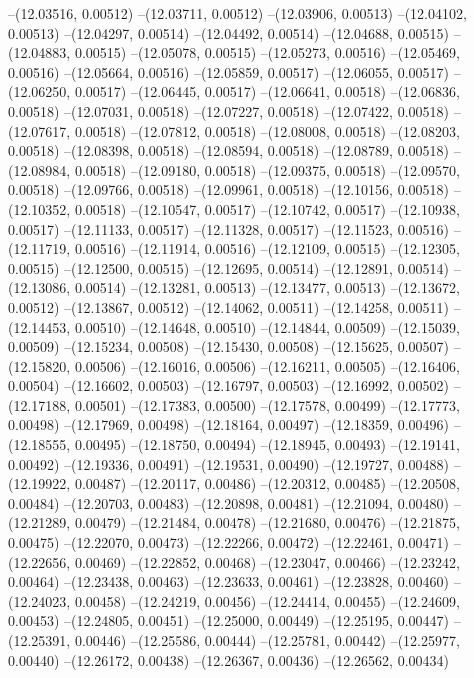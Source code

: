 --(12.03516, 0.00512)
--(12.03711, 0.00512)
--(12.03906, 0.00513)
--(12.04102, 0.00513)
--(12.04297, 0.00514)
--(12.04492, 0.00514)
--(12.04688, 0.00515)
--(12.04883, 0.00515)
--(12.05078, 0.00515)
--(12.05273, 0.00516)
--(12.05469, 0.00516)
--(12.05664, 0.00516)
--(12.05859, 0.00517)
--(12.06055, 0.00517)
--(12.06250, 0.00517)
--(12.06445, 0.00517)
--(12.06641, 0.00518)
--(12.06836, 0.00518)
--(12.07031, 0.00518)
--(12.07227, 0.00518)
--(12.07422, 0.00518)
--(12.07617, 0.00518)
--(12.07812, 0.00518)
--(12.08008, 0.00518)
--(12.08203, 0.00518)
--(12.08398, 0.00518)
--(12.08594, 0.00518)
--(12.08789, 0.00518)
--(12.08984, 0.00518)
--(12.09180, 0.00518)
--(12.09375, 0.00518)
--(12.09570, 0.00518)
--(12.09766, 0.00518)
--(12.09961, 0.00518)
--(12.10156, 0.00518)
--(12.10352, 0.00518)
--(12.10547, 0.00517)
--(12.10742, 0.00517)
--(12.10938, 0.00517)
--(12.11133, 0.00517)
--(12.11328, 0.00517)
--(12.11523, 0.00516)
--(12.11719, 0.00516)
--(12.11914, 0.00516)
--(12.12109, 0.00515)
--(12.12305, 0.00515)
--(12.12500, 0.00515)
--(12.12695, 0.00514)
--(12.12891, 0.00514)
--(12.13086, 0.00514)
--(12.13281, 0.00513)
--(12.13477, 0.00513)
--(12.13672, 0.00512)
--(12.13867, 0.00512)
--(12.14062, 0.00511)
--(12.14258, 0.00511)
--(12.14453, 0.00510)
--(12.14648, 0.00510)
--(12.14844, 0.00509)
--(12.15039, 0.00509)
--(12.15234, 0.00508)
--(12.15430, 0.00508)
--(12.15625, 0.00507)
--(12.15820, 0.00506)
--(12.16016, 0.00506)
--(12.16211, 0.00505)
--(12.16406, 0.00504)
--(12.16602, 0.00503)
--(12.16797, 0.00503)
--(12.16992, 0.00502)
--(12.17188, 0.00501)
--(12.17383, 0.00500)
--(12.17578, 0.00499)
--(12.17773, 0.00498)
--(12.17969, 0.00498)
--(12.18164, 0.00497)
--(12.18359, 0.00496)
--(12.18555, 0.00495)
--(12.18750, 0.00494)
--(12.18945, 0.00493)
--(12.19141, 0.00492)
--(12.19336, 0.00491)
--(12.19531, 0.00490)
--(12.19727, 0.00488)
--(12.19922, 0.00487)
--(12.20117, 0.00486)
--(12.20312, 0.00485)
--(12.20508, 0.00484)
--(12.20703, 0.00483)
--(12.20898, 0.00481)
--(12.21094, 0.00480)
--(12.21289, 0.00479)
--(12.21484, 0.00478)
--(12.21680, 0.00476)
--(12.21875, 0.00475)
--(12.22070, 0.00473)
--(12.22266, 0.00472)
--(12.22461, 0.00471)
--(12.22656, 0.00469)
--(12.22852, 0.00468)
--(12.23047, 0.00466)
--(12.23242, 0.00464)
--(12.23438, 0.00463)
--(12.23633, 0.00461)
--(12.23828, 0.00460)
--(12.24023, 0.00458)
--(12.24219, 0.00456)
--(12.24414, 0.00455)
--(12.24609, 0.00453)
--(12.24805, 0.00451)
--(12.25000, 0.00449)
--(12.25195, 0.00447)
--(12.25391, 0.00446)
--(12.25586, 0.00444)
--(12.25781, 0.00442)
--(12.25977, 0.00440)
--(12.26172, 0.00438)
--(12.26367, 0.00436)
--(12.26562, 0.00434)
